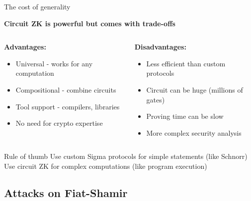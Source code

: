 \documentclass[aspectratio=169, lualatex, handout]{beamer}
\begin{document}
\begin{frame}{The cost of generality}
	\begin{center}
		\textbf{Circuit ZK is powerful but comes with trade-offs}
	\end{center}
	\vspace{0.5em}
	\begin{columns}[c]
		\begin{column}{0.5\textwidth}
			\textbf{Advantages:}
			\begin{itemize}
				\item Universal - works for any computation
				\item Compositional - combine circuits
				\item Tool support - compilers, libraries
				\item No need for crypto expertise
			\end{itemize}
		\end{column}
		\begin{column}{0.5\textwidth}
			\textbf{Disadvantages:}
			\begin{itemize}
				\item Less efficient than custom protocols
				\item Circuit can be huge (millions of gates)
				\item Proving time can be slow
				\item More complex security analysis
			\end{itemize}
		\end{column}
	\end{columns}
	\vspace{0.5em}
	\begin{exampleblock}{Rule of thumb}
		Use custom Sigma protocols for simple statements (like Schnorr)\\
		Use circuit ZK for complex computations (like program execution)
	\end{exampleblock}
\end{frame}

\subsection{Attacks on Fiat-Shamir}
\end{document}
